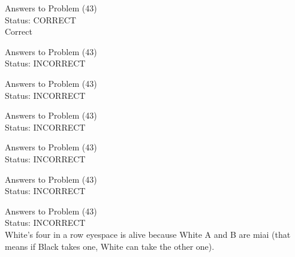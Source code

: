 \documentclass[11pt]{article}
\begin{document}
\begin{minipage}[t]{0.5\textwidth}
  {\centering
  
  Answers to Problem (43)\\
  Status: CORRECT\\
  Correct\\
  }
\end{minipage}
\begin{minipage}[t]{0.5\textwidth}
  {\centering
  
  Answers to Problem (43)\\
  Status: INCORRECT\\
  
  }
\end{minipage}
\begin{minipage}[t]{0.5\textwidth}
  {\centering
  
  Answers to Problem (43)\\
  Status: INCORRECT\\
  
  }
\end{minipage}
\begin{minipage}[t]{0.5\textwidth}
  {\centering
  
  Answers to Problem (43)\\
  Status: INCORRECT\\
  
  }
\end{minipage}
\begin{minipage}[t]{0.5\textwidth}
  {\centering
  
  Answers to Problem (43)\\
  Status: INCORRECT\\
  
  }
\end{minipage}
\begin{minipage}[t]{0.5\textwidth}
  {\centering
  
  Answers to Problem (43)\\
  Status: INCORRECT\\
  
  }
\end{minipage}
\begin{minipage}[t]{0.5\textwidth}
  {\centering
  
  Answers to Problem (43)\\
  Status: INCORRECT\\
  White's four in a row eyespace is alive because White A and B are miai (that means if Black takes one, White can take the other one).\\
  }
\end{minipage}
\end{document}
